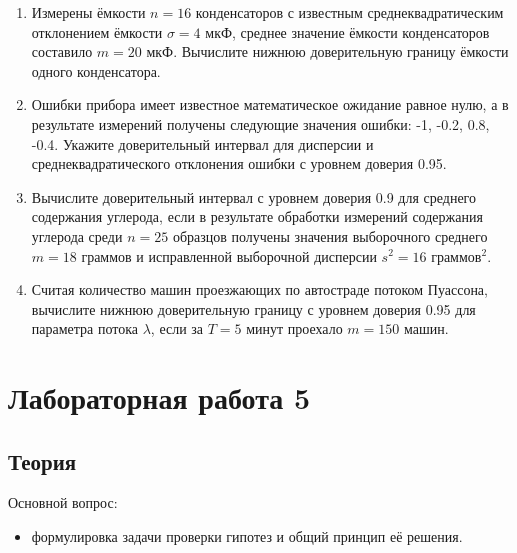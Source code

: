 \documentclass[a4paper,12pt]{article}
\begin{document}
\begin{enumerate}
      \item \cite[157]{Efimov} Измерены ёмкости $n = 16$ конденсаторов с известным среднеквадратическим отклонением ёмкости $\sigma = 4$ мкФ, среднее
            значение ёмкости конденсаторов составило $m = 20$ мкФ. Вычислите нижнюю доверительную границу ёмкости одного конденсатора.

      \item Ошибки прибора имеет известное математическое ожидание равное нулю, а в результате измерений получены следующие значения ошибки:
            -1, -0.2, 0.8, -0.4. Укажите доверительный интервал для дисперсии и среднеквадратического отклонения ошибки с уровнем доверия 0.95.

      \item \cite[160]{Efimov} Вычислите доверительный интервал с уровнем доверия 0.9 для среднего содержания углерода, если в результате
            обработки измерений содержания углерода среди $n = 25$ образцов получены значения выборочного среднего $m = 18$ граммов и исправленной
            выборочной дисперсии $s^2 = 16$ граммов$^2$.

      \item Считая количество машин проезжающих по автостраде потоком Пуассона, вычислите нижнюю доверительную границу с уровнем доверия 0.95
            для параметра потока $\lambda$, если за $T = 5$ минут проехало $m = 150$ машин.
\end{enumerate}

\section*{Лабораторная работа 5}

\subsection*{Теория}

Основной вопрос:

\begin{itemize}
      \item формулировка задачи проверки гипотез и общий принцип её решения.
\end{itemize}
\end{document}
